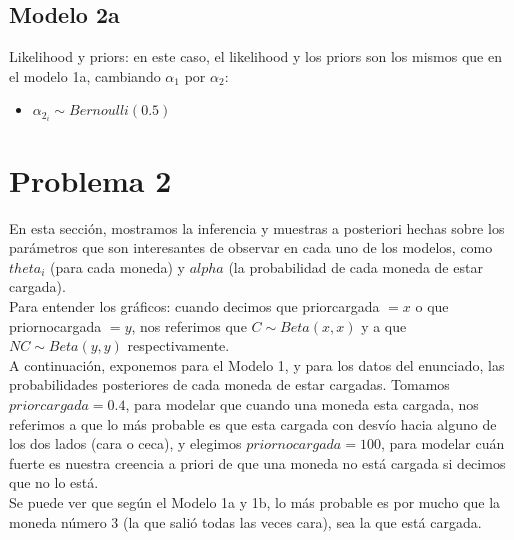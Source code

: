 \documentclass[a4paper]{article}
\begin{document}
\subsection{Modelo 2a}
\newline
Likelihood y priors: en este caso, el likelihood y los priors son los mismos que en el modelo 1a,
cambiando $\alpha_1$ 
por $\alpha_2$:
\begin{itemize}
	\item $ \alpha_{2_i} \sim Bernoulli(0.5) $
\end{itemize}

\section {Problema 2}
En esta sección, mostramos la inferencia y muestras a posteriori hechas sobre los 
parámetros que son interesantes de
observar en cada uno de los modelos, como $theta_i$ (para cada moneda) y $alpha$
(la probabilidad de cada moneda de estar cargada). \\
Para entender los gráficos: cuando decimos que priorcargada $= x$ o que 
priornocargada $= y$, nos referimos que $C \sim Beta(x,x)$ y a que 
$NC \sim Beta(y,y)$ respectivamente. \\

A continuación, exponemos para el Modelo 1, y para los datos del enunciado,
las probabilidades posteriores de cada moneda de estar cargadas. Tomamos 
$priorcargada = 0.4$, para modelar que cuando una moneda esta cargada, nos 
referimos a que lo más probable es que esta cargada con desvío hacia alguno
de los dos lados (cara o ceca), y elegimos $priornocargada = 100$, para 
modelar cuán fuerte es nuestra creencia a priori de que una moneda no está cargada si
decimos que no lo está. \\

Se puede ver que según el Modelo 1a y 1b, lo más probable es por mucho que la moneda número
3 (la que salió todas las veces cara), sea la que está cargada. 
\end{document}

